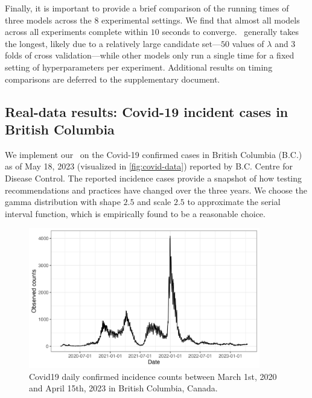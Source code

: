 Finally, it is important to provide a brief comparison of the running times of
three models across the $8$ experimental settings. We find that almost all
models across all experiments complete within $10$ seconds to converge.
\RtEstim\ generally takes the longest, likely due to a relatively large
candidate set---$50$ values of $\lambda$ and 3 folds of cross validation---while
other models only run a single time for a fixed setting of hyperparameters per
experiment. Additional results on timing comparisons are deferred to the
supplementary document. 



\subsection{Real-data results: Covid-19 incident cases in British Columbia}

We implement our \RtEstim\ on the Covid-19 confirmed cases in British Columbia
(B.C.) as of May 18, 2023 (visualized in \autoref{fig:covid-data}) reported by
B.C. Centre for Disease Control. The reported incidence cases provide a snapshot
of how testing recommendations and practices have changed over the three years.
We choose the gamma distribution with shape $2.5$ and scale $2.5$ to approximate
the serial interval function, which is empirically found to be a reasonable
choice. 

\begin{figure}[tb]
    \centering
    \includegraphics[width=0.9\textwidth]{fig/covid_dat.png}
    \caption{Covid19 daily confirmed incidence counts between March 1st, 2020 and April 15th, 2023 in British Columbia, Canada.} 
    \label{fig:covid-data}
\end{figure} 

